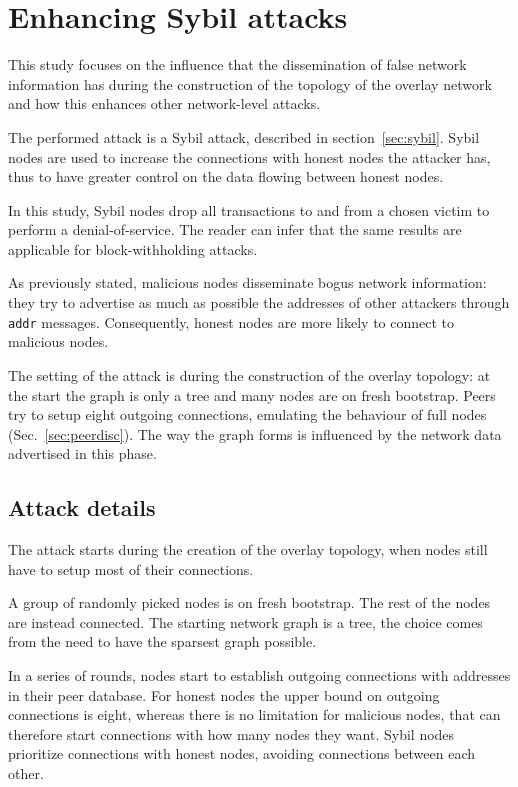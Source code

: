 \chapter{Enhancing Sybil attacks}
\label{sec:atk}
This study focuses on the influence that the dissemination of false network information has during the construction of the topology of the overlay network and how this enhances other network-level attacks.

The performed attack is a Sybil attack, described in section~\ref{sec:sybil}. Sybil nodes are used to increase the connections with honest nodes the attacker has, thus to have greater control on the data flowing between honest nodes.  

In this study, Sybil nodes drop all transactions to and from a chosen victim to perform a denial-of-service. The reader can infer that the same results are applicable for block-withholding attacks.

As previously stated, malicious nodes disseminate bogus network information: they try to advertise as much as possible the addresses of other attackers through \texttt{addr} messages. Consequently, honest nodes are more likely to connect to malicious nodes.

The setting of the attack is during the construction of the overlay topology: at the start the graph is only a tree and many nodes are on fresh bootstrap. Peers try to setup eight outgoing connections, emulating the behaviour of full nodes (Sec.~\ref{sec:peerdisc}). The way the graph forms is influenced by the network data advertised in this phase.

\section{Attack details}\label{sec:atkdetails}
The attack starts during the creation of the overlay topology, when nodes still have to setup most of their connections.

A group of randomly picked nodes is on fresh bootstrap. The rest of the nodes are instead connected. The starting network graph is a tree, the choice comes from the need to have the sparsest graph possible.

In a series of rounds, nodes start to establish outgoing connections with addresses in their peer database. For honest nodes the upper bound on outgoing connections is eight, whereas there is no limitation for malicious nodes, that can therefore start connections with how many nodes they want. Sybil nodes prioritize connections with honest nodes, avoiding connections between each other.

